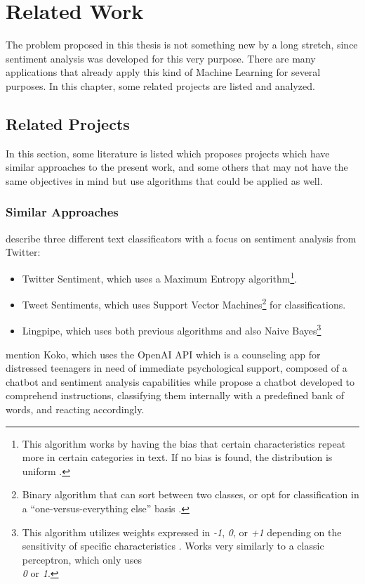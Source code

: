 \chapter{Related Work}
The problem proposed in this thesis is not something new by a long stretch, since sentiment analysis was developed for this very purpose. There are many applications that already apply this kind of Machine Learning for several purposes. In this chapter, some related projects are listed and analyzed.

\section{Related Projects}
In this section, some literature is listed which proposes projects which have similar approaches to the present work, and some others that may not have the same objectives in mind but use algorithms that could be applied as well.
\subsection{Similar Approaches}
\citet{rf10} describe three different text classificators with a focus on sentiment analysis from Twitter:\\ 
\begin{itemize}
\item Twitter Sentiment, which uses a Maximum Entropy algorithm\footnote{This algorithm works by having the bias that certain characteristics repeat more in certain categories in text. If no bias is found, the distribution is uniform \citep{rf17}.}.
\item Tweet Sentiments, which uses Support Vector Machines\footnote{Binary algorithm that can sort between two classes, or opt for classification in a ``one-versus-everything else'' basis \citep{rf18}.} for classifications.
\item Lingpipe, which uses both previous algorithms and also Naive Bayes\footnote{This algorithm utilizes weights expressed in \textit{-1}, \textit{0}, or \textit{+1} depending on the sensitivity of specific characteristics \citep{rf19}. Works very similarly to a classic perceptron, which only uses\\ \textit{0} or \textit{1}.}
\end{itemize}
\citet{rf6} mention Koko, which uses the OpenAI API which is a counseling app for distressed teenagers in need of immediate psychological support, composed of a chatbot and sentiment analysis capabilities while
\citet{rf14} propose a chatbot developed to comprehend instructions, classifying them internally with a predefined bank of words, and reacting accordingly.

